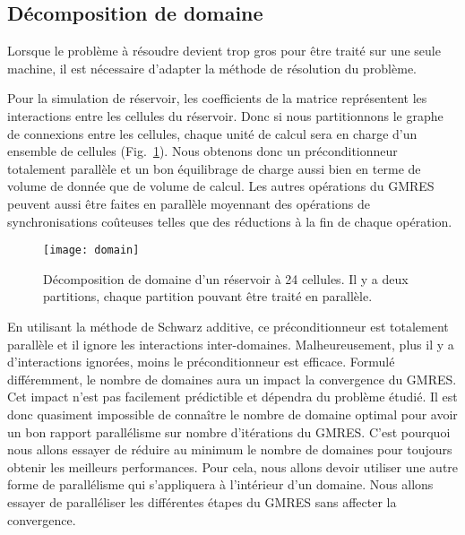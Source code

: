\subsection{Décomposition de domaine}
Lorsque le problème à résoudre devient trop gros pour être traité sur une seule machine, il est nécessaire d'adapter la méthode de résolution du problème.

Pour la simulation de réservoir, les coefficients de la matrice représentent les interactions entre les cellules du réservoir.
%
Donc si nous partitionnons le graphe de connexions entre les cellules, chaque unité de calcul sera en charge d'un ensemble de cellules (Fig.~\ref{fig:domain}).
%
Nous obtenons donc un préconditionneur totalement parallèle et un bon équilibrage de charge aussi bien en terme de volume de donnée que de volume de calcul.
%
Les autres opérations du GMRES peuvent aussi être faites en parallèle moyennant des opérations de synchronisations coûteuses telles que des réductions à la fin de chaque opération.

\begin{figure}
  \centering
  \texttt{[image: domain]}
  \caption{Décomposition de domaine d'un réservoir à 24 cellules. Il y a deux partitions, chaque partition pouvant être traité en parallèle.}
  \label{fig:domain}
\end{figure}

En utilisant la méthode de Schwarz additive, ce préconditionneur est totalement parallèle et il ignore les interactions inter-domaines.
%
Malheureusement, plus il y a d'interactions ignorées, moins le préconditionneur est efficace.
%
Formulé différemment, le nombre de domaines aura un impact la convergence du GMRES.
%
Cet impact n'est pas facilement prédictible et dépendra du problème étudié.
%
Il est donc quasiment impossible de connaître le nombre de domaine optimal pour avoir un bon rapport parallélisme sur nombre d'itérations du GMRES.
%
C'est pourquoi nous allons essayer de réduire au minimum le nombre de domaines pour toujours obtenir les meilleurs performances.
%
Pour cela, nous allons devoir utiliser une autre forme de parallélisme qui s'appliquera à l'intérieur d'un domaine.
%
Nous allons essayer de paralléliser les différentes étapes du GMRES sans affecter la convergence.
